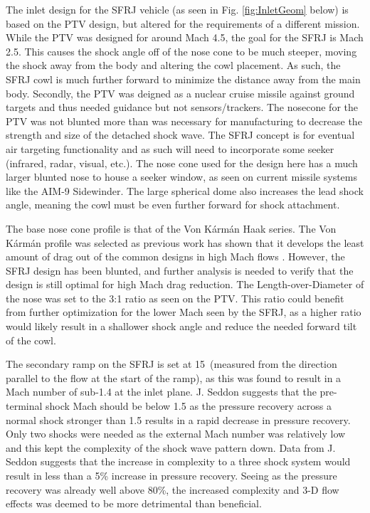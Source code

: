 The inlet design for the SFRJ vehicle (as seen in Fig. \ref{fig:InletGeom} below) is based on the PTV design, but altered for the requirements of a different mission. While the PTV was designed for around Mach 4.5, the goal for the SFRJ is Mach 2.5. This causes the shock angle off of the nose cone to be much steeper, moving the shock away from the body and altering the cowl placement. As such, the SFRJ cowl is much further forward to minimize the distance away from the main body. Secondly, the PTV was deigned as a nuclear cruise missile against ground targets and thus needed guidance but not sensors/trackers. The nosecone for the PTV was not blunted more than was necessary for manufacturing to decrease the strength and size of the detached shock wave. The SFRJ concept is for eventual air targeting functionality and as such will need to incorporate some seeker (infrared, radar, visual, etc.). The nose cone used for the design here has a much larger blunted nose to house a seeker window, as seen on current missile systems like the AIM-9 Sidewinder. The large spherical dome also increases the lead shock angle, meaning the cowl must be even further forward for shock attachment.

The base nose cone profile is that of the Von K\'arm\'an Haak series. The Von K\'arm\'an profile was selected as previous work has shown that it develops the least amount of drag out of the common designs in high Mach flows \cite{crowell}. However, the SFRJ design has been blunted, and further analysis is needed to verify that the design is still optimal for high Mach drag reduction. The Length-over-Diameter of the nose was set to the 3:1 ratio as seen on the PTV. This ratio could benefit from further optimization for the lower Mach seen by the SFRJ, as a higher ratio would likely result in a shallower shock angle and reduce the needed forward tilt of the cowl. 

The secondary ramp on the SFRJ is set at 15\textdegree\ (measured from the direction parallel to the flow at the start of the ramp), as this was found to result in a Mach number of sub-1.4 at the inlet plane. J. Seddon \cite{seddon_goldsmith_1999} suggests that the pre-terminal shock Mach should be below 1.5 as the pressure recovery across a normal shock stronger than 1.5 results in a rapid decrease in pressure recovery. Only two shocks were  needed as the external Mach number was relatively low and this kept the complexity of the shock wave pattern down. Data from J. Seddon suggests that the increase in complexity to a three shock system would result in less than a 5\% increase in pressure recovery. Seeing as the pressure recovery was already well above 80\%, the increased complexity and 3-D flow effects was deemed to be more detrimental than beneficial.

